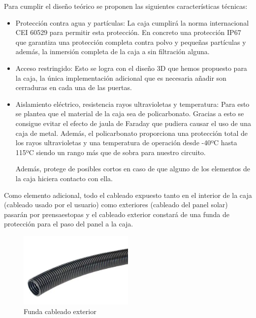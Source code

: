 Para cumplir el diseño teórico se proponen las siguientes características técnicas:
\begin{itemize}
    \item Protección contra agua y partículas: La caja cumplirá la norma internacional CEI 60529 para permitir esta protección. En concreto una protección IP67 que garantiza una protección completa contra polvo y pequeñas partículas y además, la inmersión completa de la caja a sin filtración alguna.\cite{iecInternationalStandardIEC}

    \item Acceso restringido: Esto se logra con el diseño 3D que hemos propuesto para la caja, la única implementación adicional que es necesaria añadir son cerraduras en cada una de las puertas.

    \item Aislamiento eléctrico, resistencia rayos ultravioletas y temperatura: Para esto se plantea que el material de la caja sea de policarbonato. Gracias a esto se consigue evitar el efecto de jaula de Faraday que pudiera causar el uso de una caja de metal. Además, el policarbonato proporciona una protección total de los rayos ultravioletas y una temperatura de operación desde -40ºC hasta 115ºC siendo un rango más que de sobra para nuestro circuito.\cite{horeshPolycarbonateProtectionUV2021}

    Además, protege de posibles cortos en caso de que alguno de los elementos de la caja hiciera contacto con ella.
\end{itemize}

Como elemento adicional, todo el cableado expuesto tanto en el interior de la caja (cableado usado por el usuario) como exteriores (cableado del panel solar) pasarán por prensaestopas y el cableado exterior constará de una funda de protección para el paso del panel a la caja.
\begin{figure}[H]
    \centering
    \includegraphics[width=0.5\textwidth]{images/4-DesarrolloTeorico/4-1-caja/CAJA_FUNDAS.png}
    \caption{Funda cableado exterior}
    \label{fig:DesarrolloTeorico/Caja/CAJA_FUNDA}
\end{figure}

